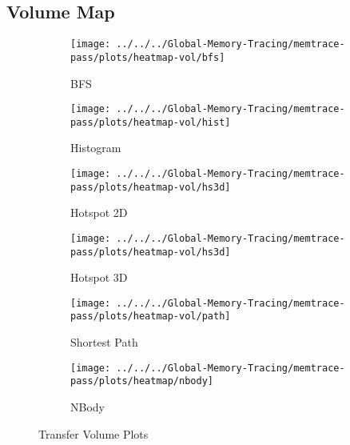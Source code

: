\subsection{Volume Map}
\begin{figure}
	\begin{subfigure}[b]{0.45\textwidth}
		\texttt{[image: ../../../Global-Memory-Tracing/memtrace-pass/plots/heatmap-vol/bfs]}
		\caption{BFS}
		\label{fig:volume-bfs}
	\end{subfigure}
	\begin{subfigure}[b]{0.45\textwidth}
		\texttt{[image: ../../../Global-Memory-Tracing/memtrace-pass/plots/heatmap-vol/hist]}
		\caption{Histogram}
		\label{fig:volume-hist}
	\end{subfigure}
	\begin{subfigure}[b]{0.45\textwidth}
		\texttt{[image: ../../../Global-Memory-Tracing/memtrace-pass/plots/heatmap-vol/hs3d]}
		\caption{Hotspot 2D}
		\label{fig:volume-hs2d}
	\end{subfigure}
	\begin{subfigure}[b]{0.45\textwidth}
		\texttt{[image: ../../../Global-Memory-Tracing/memtrace-pass/plots/heatmap-vol/hs3d]}
		\caption{Hotspot 3D}
		\label{fig:volume-hs3d}
	\end{subfigure}
	\begin{subfigure}[b]{0.45\textwidth}
		\texttt{[image: ../../../Global-Memory-Tracing/memtrace-pass/plots/heatmap-vol/path]}
		\caption{Shortest Path}
		\label{fig:volume-path}
	\end{subfigure}
	\hfill
	\begin{subfigure}[b]{0.45\textwidth}
		\texttt{[image: ../../../Global-Memory-Tracing/memtrace-pass/plots/heatmap/nbody]}
		\caption{NBody}
		\label{fig:volume-nbody}
	\end{subfigure}
	\caption{Transfer Volume Plots}
	\label{fig:animals}
\end{figure}
